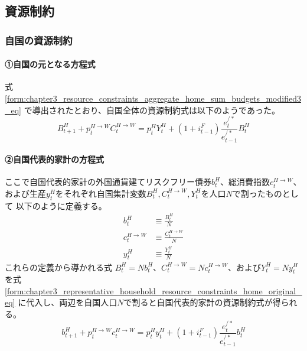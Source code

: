 
\subsection{資源制約}
\label{sec:chapter3_representative_household_resource_constraints}

\subsubsection{自国の資源制約}
\label{sec:chapter3_representative_household_resource_constraints_home}

\paragraph{①自国の元となる方程式}
\label{sec:chapter3_representative_household_resource_constraints_home_original}
式
\eqref{form:chapter3_resource_constraints_aggregate_home_sum_budgets_modified3_eq}
で導出されたとおり、自国全体の資源制約式は以下のようであった。
\begin{equation}
\label{form:chapter3_representative_household_resource_constraints_home_original_eq}
    B_{t+1}^H+p_t^{H\to W}C_t^{H\to W}=p_t^HY_t^H+(1+i_{t-1}^F)\frac{e_t^{/*}}{e_{t-1}^{/*}}B_t^H
\end{equation}

\paragraph{②自国代表的家計の方程式}
\label{sec:chapter3_representative_household_resource_constraints_home_representative}
ここで自国代表的家計の外国通貨建てリスクフリー債券\(b_t^H\)、総消費指数\(c_t^{H\to W}\)、
および生産\(y_t^H\)をそれぞれ自国集計変数\(B_t^H, C_t^{H\to W}, Y_t^H\)を人口\(N\)で割ったものとして
以下のように定義する。
\begin{align}
    \label{form:chapter3_representative_household_resource_constraints_home_representative_b_H_def}
        b_t^H&\equiv\frac{B_t^H}{N} \\
    \label{form:chapter3_representative_household_resource_constraints_home_representative_c_H_W_def}
        c_t^{H\to W}&\equiv\frac{C_t^{H\to W}}{N} \\
    \label{form:chapter3_representative_household_resource_constraints_home_representative_y_H_def}
        y_t^H&\equiv\frac{Y_t^H}{N}
\end{align}
これらの定義から導かれる式
\(B_t^H=Nb_t^H\)、\(C_t^{H\to W}=Nc_t^{H\to W}\)、および\(Y_t^H=Ny_t^H\)を式
\eqref{form:chapter3_representative_household_resource_constraints_home_original_eq}
に代入し、両辺を自国人口\(N\)で割ると自国代表的家計の資源制約式が得られる。
\begin{equation}
\label{form:chapter3_representative_household_resource_constraints_home_representative_constraint_eq}
    b_{t+1}^H+p_t^{H\to W}c_t^{H\to W}=p_t^Hy_t^H+(1+i_{t-1}^F)\frac{e_t^{/*}}{e_{t-1}^{/*}}b_t^H
\end{equation}

